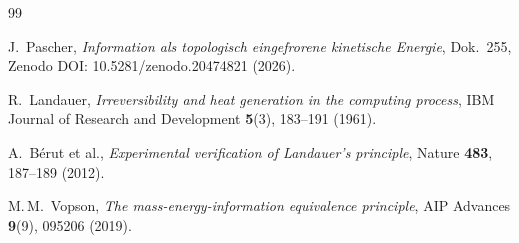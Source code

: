 \begin{thebibliography}{99}

J.~Pascher,
\textit{Information als topologisch eingefrorene kinetische Energie},
Dok.~255, Zenodo DOI: 10.5281/zenodo.20474821 (2026).

R.~Landauer,
\textit{Irreversibility and heat generation in the computing process},
IBM Journal of Research and Development \textbf{5}(3), 183--191 (1961).

A.~Bérut et al.,
\textit{Experimental verification of Landauer's principle},
Nature \textbf{483}, 187--189 (2012).

M.\,M.~Vopson,
\textit{The mass-energy-information equivalence principle},
AIP Advances \textbf{9}(9), 095206 (2019).

\end{thebibliography}
